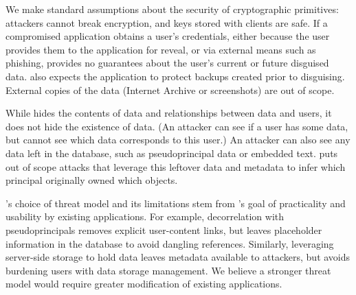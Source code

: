 %
We make standard assumptions about the security of cryptographic primitives:
attackers cannot break encryption, and keys stored with clients are safe.
%
If a compromised application obtains a user's credentials, either because the
user provides them to the application for reveal, or via external means such as
phishing, \sys provides no guarantees about the user's current or future
disguised data.
%
\sys also expects the application to protect backups created prior to
disguising. External copies of the data (\eg Internet Archive or screenshots)
are out of scope.
%

%
While \sys hides the contents of \xxed data and relationships between \xxed data
and users, it does not hide the existence of
\xxed data. (An attacker can see if
a user has \xxed some data, but cannot see which \xxed data corresponds to this
user.)
%
An attacker can also see any data left in the database, such as pseudoprincipal
data or embedded text.
%
\sys puts out of scope attacks that leverage this leftover data
and metadata to infer which principal originally owned which objects.
%

\sys's choice of threat model and its limitations stem from
\sys's goal of practicality and usability by existing applications.
%
For example, decorrelation with pseudoprincipals removes explicit user-content
links, but leaves placeholder information in the database to avoid dangling references.
%
Similarly, leveraging server-side storage to hold \xxed data leaves
metadata available to attackers, but avoids burdening users with data storage
management.
%
We believe a stronger threat model would require greater modification of
existing applications.
